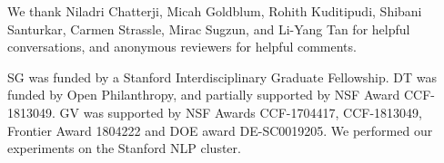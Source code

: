 We thank Niladri Chatterji, Micah Goldblum, Rohith Kuditipudi, Shibani Santurkar, Carmen Strassle,  Mirac Sugzun, and Li-Yang Tan for helpful conversations, and anonymous reviewers for helpful comments. 

SG was funded by a  Stanford Interdisciplinary Graduate Fellowship.
DT was funded by Open Philanthropy, and partially supported by NSF Award CCF-1813049.  GV was supported by NSF Awards CCF-1704417, CCF-1813049, Frontier Award 1804222 and DOE award DE-SC0019205.
We performed our experiments on the Stanford NLP cluster.